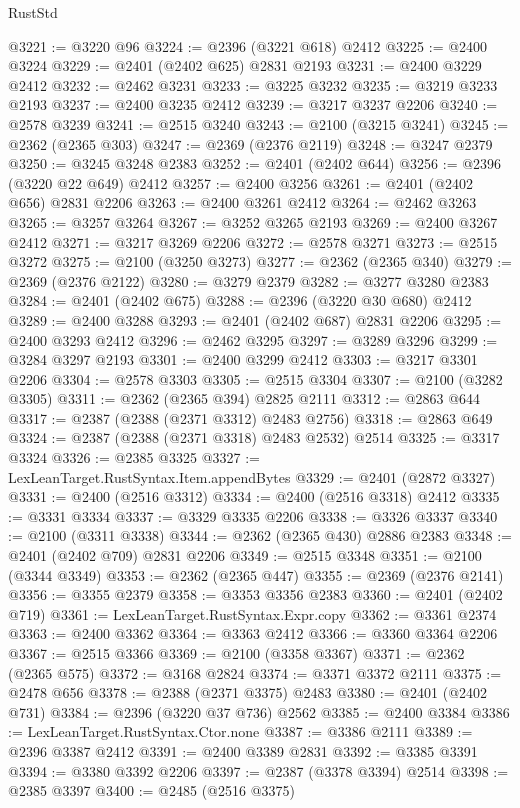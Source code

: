 \begin{lexlean}{RustStd}
\begin{coremodule}
{\begin{coremodule}
{{{{{{{{{{{{{{{{{{{{{{{{{{{{{{{{{{{{{{{{{{{{{{{{{{@3221 := @3220 @96
@3224 := @2396 (@3221 @618) @2412
@3225 := @2400 @3224
@3229 := @2401 (@2402 @625) @2831 @2193
@3231 := @2400 @3229 @2412
@3232 := @2462 @3231
@3233 := @3225 @3232
@3235 := @3219 @3233 @2193
@3237 := @2400 @3235 @2412
@3239 := @3217 @3237 @2206
@3240 := @2578 @3239
@3241 := @2515 @3240
@3243 := @2100 (@3215 @3241)
@3245 := @2362 (@2365 @303)
@3247 := @2369 (@2376 @2119)
@3248 := @3247 @2379
@3250 := @3245 @3248 @2383
@3252 := @2401 (@2402 @644)
@3256 := @2396 (@3220 @22 @649) @2412
@3257 := @2400 @3256
@3261 := @2401 (@2402 @656) @2831 @2206
@3263 := @2400 @3261 @2412
@3264 := @2462 @3263
@3265 := @3257 @3264
@3267 := @3252 @3265 @2193
@3269 := @2400 @3267 @2412
@3271 := @3217 @3269 @2206
@3272 := @2578 @3271
@3273 := @2515 @3272
@3275 := @2100 (@3250 @3273)
@3277 := @2362 (@2365 @340)
@3279 := @2369 (@2376 @2122)
@3280 := @3279 @2379
@3282 := @3277 @3280 @2383
@3284 := @2401 (@2402 @675)
@3288 := @2396 (@3220 @30 @680) @2412
@3289 := @2400 @3288
@3293 := @2401 (@2402 @687) @2831 @2206
@3295 := @2400 @3293 @2412
@3296 := @2462 @3295
@3297 := @3289 @3296
@3299 := @3284 @3297 @2193
@3301 := @2400 @3299 @2412
@3303 := @3217 @3301 @2206
@3304 := @2578 @3303
@3305 := @2515 @3304
@3307 := @2100 (@3282 @3305)
@3311 := @2362 (@2365 @394) @2825 @2111
@3312 := @2863 @644
@3317 := @2387 (@2388 (@2371 @3312) @2483 @2756)
@3318 := @2863 @649
@3324 := @2387 (@2388 (@2371 @3318) @2483 @2532) @2514
@3325 := @3317 @3324
@3326 := @2385 @3325
@3327 := LexLeanTarget.RustSyntax.Item.appendBytes
@3329 := @2401 (@2872 @3327)
@3331 := @2400 (@2516 @3312)
@3334 := @2400 (@2516 @3318) @2412
@3335 := @3331 @3334
@3337 := @3329 @3335 @2206
@3338 := @3326 @3337
@3340 := @2100 (@3311 @3338)
@3344 := @2362 (@2365 @430) @2886 @2383
@3348 := @2401 (@2402 @709) @2831 @2206
@3349 := @2515 @3348
@3351 := @2100 (@3344 @3349)
@3353 := @2362 (@2365 @447)
@3355 := @2369 (@2376 @2141)
@3356 := @3355 @2379
@3358 := @3353 @3356 @2383
@3360 := @2401 (@2402 @719)
@3361 := LexLeanTarget.RustSyntax.Expr.copy
@3362 := @3361 @2374
@3363 := @2400 @3362
@3364 := @3363 @2412
@3366 := @3360 @3364 @2206
@3367 := @2515 @3366
@3369 := @2100 (@3358 @3367)
@3371 := @2362 (@2365 @575)
@3372 := @3168 @2824
@3374 := @3371 @3372 @2111
@3375 := @2478 @656
@3378 := @2388 (@2371 @3375) @2483
@3380 := @2401 (@2402 @731)
@3384 := @2396 (@3220 @37 @736) @2562
@3385 := @2400 @3384
@3386 := LexLeanTarget.RustSyntax.Ctor.none
@3387 := @3386 @2111
@3389 := @2396 @3387 @2412
@3391 := @2400 @3389 @2831
@3392 := @3385 @3391
@3394 := @3380 @3392 @2206
@3397 := @2387 (@3378 @3394) @2514
@3398 := @2385 @3397
@3400 := @2485 (@2516 @3375)
}}}}}}}}}}}}}}}}}}}}}}}}}}}}}}}}}}}}}}}}}}}}}}}}}}
\end{coremodule}}
\end{coremodule}
\end{lexlean}
